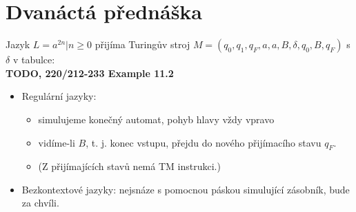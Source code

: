 \documentclass[../main.tex]{subfiles}
\begin{document}
\section{Dvanáctá přednáška}

\begin{example}
    Jazyk $L = {a^{2n}|n \geq 0}$ přijíma Turingův stroj $M = ({q_0,q_1,q_F},{a},{a,B},\delta,q_0,B, {q_F})$ s 
    $\delta$ v tabulce:\\
    \textbf{TODO, 220/212-233 Example 11.2}
\end{example}
 \begin{itemize}
     \item Regulární jazyky:
     \begin{itemize}
         \item simulujeme konečný automat, pohyb hlavy vždy vpravo
         \item vidíme-li $B$, t. j. konec vstupu, přejdu do nového přijímacího stavu $q_F$.
         \item (Z přijímajících stavů nemá TM instrukci.)
     \end{itemize}
     \item Bezkontextové jazyky: nejsnáze s pomocnou páskou simulující zásobník, bude za chvíli.
 \end{itemize}
\end{document}
